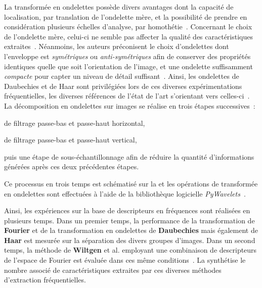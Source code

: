 La transformée en ondelettes possède divers avantages dont la capacité de localisation, par translation de l'ondelette mère, et la possibilité de prendre en considération plusieurs échelles d'analyse, par homothétie~\cite{Livens1997,Wiltgen2008}. Concernant le choix de l'ondelette mère, celui-ci ne semble pas affecter la qualité des caractéristiques extraites~\cite{Fatemi1996, Livens1997}. Néanmoins, les auteurs préconisent le choix d'ondelettes dont l'enveloppe est \textit{symétriques} ou \textit{anti-symétriques} afin de conserver des propriétés identiques quelle que soit l'orientation de l'image, et une ondelette suffisamment \textit{compacte} pour capter un niveau de détail suffisant~\cite{Livens1997}. Ainsi, les ondelettes de Daubechies et de Haar sont privilégiées lors de ces diverses expérimentations fréquentielles, les diverses références de l'état de l'art s'orientant vers celles-ci~\cite{Wiltgen2008,Halimi2017a}. La décomposition en ondelettes sur images se réalise en trois étapes successives~: 
\begin{inlinerate}
    \item de filtrage passe-bas et passe-haut horizontal,
    \item de filtrage passe-bas et passe-haut vertical,
    \item puis une étape de sous-échantillonnage afin de réduire la quantité d'informations générées après ces deux précédentes étapes.
\end{inlinerate} Ce processus en trois temps est schématisé sur la  et les opérations de transformée en ondelettes sont effectuées à l'aide de la bibliothèque logicielle \textit{PyWavelets}~\cite{lee2006}.\par

Ainsi, les expériences sur la base de descripteurs en fréquences sont réalisées en plusieurs temps. Dans un premier temps, la performance de la transformation de \textbf{Fourier} et de la transformation en ondelettes de \textbf{Daubechies} mais également de \textbf{Haar} est mesurée sur la séparation des divers groupes d'images. Dans un second temps, la méthode de \textbf{Wiltgen} et al. employant une combinaison de descripteurs de l'espace de Fourier est évaluée dans ces même conditions~\cite{Wiltgen2008}. La  synthétise le nombre associé de caractéristiques extraites par ces diverses méthodes d'extraction fréquentielles.\par

